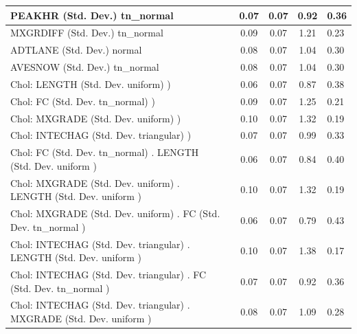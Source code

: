 \begin{table}
\begin{center}
\begin{tabular}{|l|l|c|c|c|l|}
			\hline
			PEAKHR (Std. Dev.) tn_normal &  & 0.07 & 0.07 & 0.92 & 0.36 \\
			\hline
			MXGRDIFF (Std. Dev.) tn_normal &  & 0.09 & 0.07 & 1.21 & 0.23 \\
			\hline
			ADTLANE (Std. Dev.) normal &  & 0.08 & 0.07 & 1.04 & 0.30 \\
			\hline
			AVESNOW (Std. Dev.) tn_normal &  & 0.08 & 0.07 & 1.04 & 0.30 \\
			\hline
			 Chol: LENGTH (Std. Dev. uniform) ) &  & 0.06 & 0.07 & 0.87 & 0.38 \\
			\hline
			 Chol: FC (Std. Dev. tn_normal) ) &  & 0.09 & 0.07 & 1.25 & 0.21 \\
			\hline
			 Chol: MXGRADE (Std. Dev. uniform) ) &  & 0.10 & 0.07 & 1.32 & 0.19 \\
			\hline
			 Chol: INTECHAG (Std. Dev. triangular) ) &  & 0.07 & 0.07 & 0.99 & 0.33 \\
			\hline
			 Chol: FC (Std. Dev. tn_normal) . LENGTH (Std. Dev.   uniform ) &  & 0.06 & 0.07 & 0.84 & 0.40 \\
			\hline
			 Chol: MXGRADE (Std. Dev. uniform) . LENGTH (Std. Dev.   uniform ) &  & 0.10 & 0.07 & 1.32 & 0.19 \\
			\hline
			 Chol: MXGRADE (Std. Dev. uniform) . FC (Std. Dev.   tn_normal ) &  & 0.06 & 0.07 & 0.79 & 0.43 \\
			\hline
			 Chol: INTECHAG (Std. Dev. triangular) . LENGTH (Std. Dev.   uniform ) &  & 0.10 & 0.07 & 1.38 & 0.17 \\
			\hline
			 Chol: INTECHAG (Std. Dev. triangular) . FC (Std. Dev.   tn_normal ) &  & 0.07 & 0.07 & 0.92 & 0.36 \\
			\hline
			 Chol: INTECHAG (Std. Dev. triangular) . MXGRADE (Std. Dev.   uniform ) &  & 0.08 & 0.07 & 1.09 & 0.28 \\
			\hline
		\end{tabular}
	\end{center}
\end{table}
